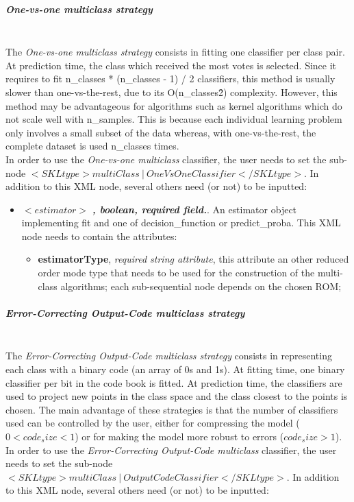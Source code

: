 \subparagraph{One-vs-one multiclass strategy}
\mbox{}
\\The \textit{One-vs-one multiclass strategy} consists in fitting one classifier per class pair. 
At prediction time, the class which received the most votes is selected. Since it requires to fit n\_classes * (n\_classes - 1) / 2 classifiers, this method is usually slower than one-vs-the-rest, due to its O(n\_classes\^2) complexity. However, this method may be advantageous for algorithms such as kernel algorithms which do not scale well with n\_samples. This is because each individual learning problem only involves a small subset of the data whereas, with one-vs-the-rest, the complete dataset is used n\_classes times.
\\In order to use the   \textit{One-vs-one multiclass} classifier, the user needs to set the sub-node $<SKLtype>multiClass~\vert~OneVsOneClassifier</SKLtype>$. In addition to this XML node, several others need (or not) to be inputted:
\begin{itemize}
\item $<estimator>$ \textbf{\textit{, boolean, required field.}}.  An estimator object implementing fit and one of decision\_function or predict\_proba. This XML node needs to contain the attributes:
\vspace{-5mm}
\begin{itemize}
\itemsep0em
\item \textbf{estimatorType}, \textit{required string attribute}, this attribute an other reduced order mode type that needs to be used for the construction of the multi-class algorithms; each sub-sequential node depends on the chosen ROM;
\end{itemize}
\end{itemize}
\subparagraph{Error-Correcting Output-Code multiclass strategy}
\mbox{}
\\The \textit{Error-Correcting Output-Code multiclass strategy} consists in representing each class with a binary code (an array of 0s and 1s). At fitting time, one binary classifier per bit in the code book is fitted. At prediction time, the classifiers are used to project new points in the class space and the class closest to the points is chosen. The main advantage of these strategies is that the number of classifiers used can be controlled by the user, either for compressing the model ($0 < code_size < 1$) or for making the model more robust to errors ($code_size > 1$).
\\In order to use the   \textit{Error-Correcting Output-Code multiclass} classifier, the user needs to set the sub-node $<SKLtype>multiClass~\vert~OutputCodeClassifier</SKLtype>$. In addition to this XML node, several others need (or not) to be inputted:
